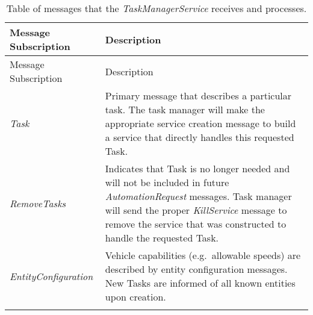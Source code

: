\begin{longtable}[c]{@{}ll@{}}
\caption{Table of messages that the \emph{TaskManagerService} receives
and processes.}\tabularnewline
\toprule
\begin{minipage}[b]{0.29\columnwidth}\raggedright\strut
Message Subscription
\strut\end{minipage} &
\begin{minipage}[b]{0.65\columnwidth}\raggedright\strut
Description
\strut\end{minipage}\tabularnewline
\midrule
\endfirsthead
\toprule
\begin{minipage}[b]{0.29\columnwidth}\raggedright\strut
Message Subscription
\strut\end{minipage} &
\begin{minipage}[b]{0.65\columnwidth}\raggedright\strut
Description
\strut\end{minipage}\tabularnewline
\midrule
\endhead
\begin{minipage}[t]{0.29\columnwidth}\raggedright\strut
\emph{Task}
\strut\end{minipage} &
\begin{minipage}[t]{0.65\columnwidth}\raggedright\strut
Primary message that describes a particular task. The task manager will
make the appropriate service creation message to build a service that
directly handles this requested Task.
\strut\end{minipage}\tabularnewline
\begin{minipage}[t]{0.29\columnwidth}\raggedright\strut
\emph{RemoveTasks}
\strut\end{minipage} &
\begin{minipage}[t]{0.65\columnwidth}\raggedright\strut
Indicates that Task is no longer needed and will not be included in
future \emph{AutomationRequest} messages. Task manager will send the
proper \emph{KillService} message to remove the service that was
constructed to handle the requested Task.
\strut\end{minipage}\tabularnewline
\begin{minipage}[t]{0.29\columnwidth}\raggedright\strut
\emph{EntityConfiguration}
\strut\end{minipage} &
\begin{minipage}[t]{0.65\columnwidth}\raggedright\strut
Vehicle capabilities (e.g.~allowable speeds) are described by entity
configuration messages. New Tasks are informed of all known entities
upon creation.
\strut\end{minipage}\tabularnewline
\begin{minipage}[t]{0.29\columnwidth}\raggedright\strut

\end{minipage}
\end{longtable}
